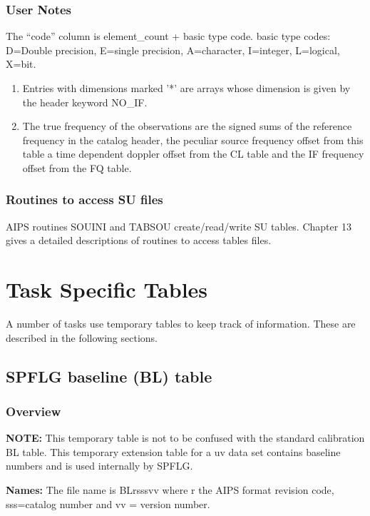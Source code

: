 \subsubsection{User Notes}

  The ``code'' column is element\_count + basic type code.
basic type codes: D=Double precision, E=single precision, A=character,
I=integer, L=logical, X=bit.
\begin{enumerate}
\item  Entries with dimensions marked '*' are arrays whose
dimension is given by the header keyword NO\_IF.
\item  The true frequency of the observations are the signed sums of the
reference frequency in the catalog header, the peculiar source frequency
offset from this table a time dependent doppler offset from the CL table
and the IF frequency offset from the FQ table.
\end{enumerate}

\subsubsection{Routines to access SU files}
     AIPS routines SOUINI and TABSOU
create/read/write SU tables.  Chapter 13 gives a detailed descriptions
of routines to access tables files.



\section {Task Specific Tables}
   A number of tasks use temporary tables to keep track of
information.  These are described in the following sections.

\subsection{SPFLG baseline (BL) table}
\subsubsection{Overview}
   {\bf NOTE:} This temporary table is not to be confused with the standard
calibration BL table.
   This temporary extension table for a uv data set contains baseline
numbers and is used internally by SPFLG.

{\bf Names:} The file name is BLrsssvv where r the AIPS format revision code,
sss=catalog number and vv = version number.

